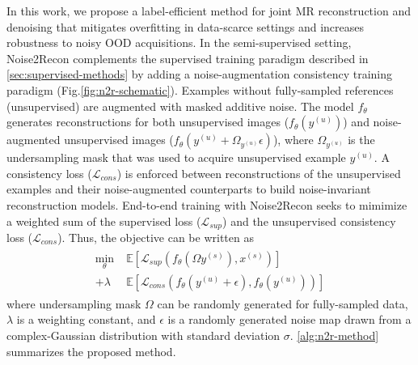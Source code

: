 \documentclass[10pt,twocolumn,letterpaper]{article}
\begin{document}
In this work, we propose a label-efficient method for joint MR reconstruction and denoising that mitigates overfitting in data-scarce settings and increases robustness to noisy OOD acquisitions. In the semi-supervised setting, Noise2Recon complements the supervised training paradigm described in \cref{sec:supervised-methods} by adding a noise-augmentation consistency training paradigm (Fig.\ref{fig:n2r-schematic}). Examples without fully-sampled references (unsupervised) are augmented with masked additive noise. The model $f_{\theta}$ generates reconstructions for both unsupervised images ($f_{\theta}(y^{(u)})$) and noise-augmented unsupervised images ($f_{\theta}(y^{(u)}+\Omega_{y^{(u)}}\epsilon)$), where $\Omega_{y^{(u)}}$ is the undersampling mask that was used to acquire unsupervised example $y^{(u)}$. A consistency loss ($\mathcal{L}_{cons}$) is enforced between reconstructions of the unsupervised examples and their noise-augmented counterparts to build noise-invariant reconstruction models. End-to-end training with Noise2Recon seeks to mimimize a weighted sum of the supervised loss ($\mathcal{L}_{sup}$) and the unsupervised consistency loss ($\mathcal{L}_{cons}$). Thus, the objective can be written as
\begin{align}
\label{eq:n2r-obj}
\begin{split}
	\min_\theta \;&\mathbb{E}[\mathcal{L}_{sup}(f_{\theta}(\Omega y^{(s)}), x^{(s)})] \\+ \lambda &\mathbb{E}[\mathcal{L}_{cons}(f_{\theta}(y^{(u)}+\epsilon),f_{\theta}(y^{(u)}))]
\end{split}
\end{align}
where undersampling mask $\Omega$ can be randomly generated for fully-sampled data, $\lambda$ is a weighting constant, and $\epsilon$ is a randomly generated noise map drawn from a complex-Gaussian distribution with standard deviation $\sigma$. \cref{alg:n2r-method} summarizes the proposed method.
\end{document}
